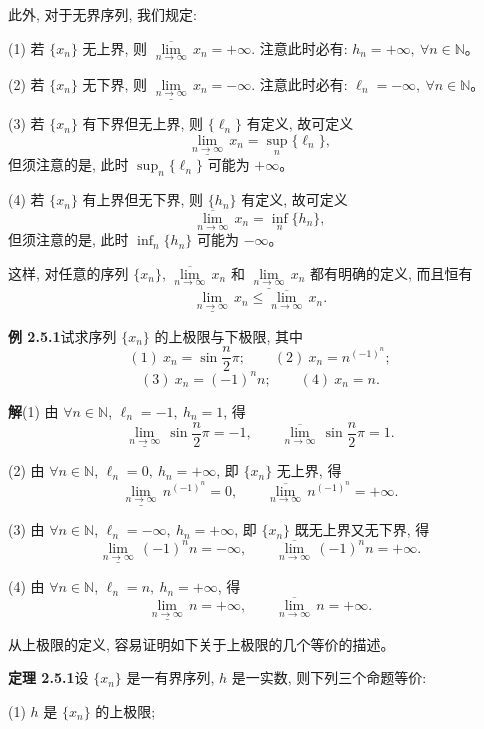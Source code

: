 \documentclass[UTF8, 12pt, fontset=fandol, oneside]{ctexart}
\begin{document}
此外, 对于无界序列, 我们规定:

(1) 若 $\{x_n\}$ 无上界, 则 $\overline{\lim\limits_{n\to\infty}}\,x_n=+\infty$. 注意此时必有: $h_n=+\infty,\ \forall n\in\mathbb{N}$。

(2) 若 $\{x_n\}$ 无下界, 则 $\underline{\lim\limits_{n\to\infty}}\,x_n=-\infty$. 注意此时必有: $\ell_n=-\infty,\ \forall n\in\mathbb{N}$。

(3) 若 $\{x_n\}$ 有下界但无上界, 则 $\{\ell_n\}$ 有定义, 故可定义
\[
  \underline{\lim_{n\to\infty}}\,x_n=\sup_n\{\ell_n\},
\]
但须注意的是, 此时 $\sup_n\{\ell_n\}$ 可能为 $+\infty$。

(4) 若 $\{x_n\}$ 有上界但无下界, 则 $\{h_n\}$ 有定义, 故可定义
\[
  \overline{\lim_{n\to\infty}}\,x_n=\inf_n\{h_n\},
\]
但须注意的是, 此时 $\inf_n\{h_n\}$ 可能为 $-\infty$。

这样, 对任意的序列 $\{x_n\}$, $\overline{\lim\limits_{n\to\infty}}\,x_n$ 和 $\underline{\lim\limits_{n\to\infty}}\,x_n$ 都有明确的定义, 而且恒有
\[
  \underline{\lim_{n\to\infty}}\,x_n
  \leqslant
  \overline{\lim_{n\to\infty}}\,x_n.
\]

\noindent\textbf{例 2.5.1}\quad 试求序列 $\{x_n\}$ 的上极限与下极限, 其中
\[
  (1)\ x_n=\sin\frac n2\pi;\qquad
  (2)\ x_n=n^{(-1)^n};
\]
\[
  (3)\ x_n=(-1)^n n;\qquad
  (4)\ x_n=n.
\]

\noindent\textbf{解}\quad (1) 由 $\forall n\in\mathbb{N}$, $\ell_n=-1,\ h_n=1$, 得
\[
  \underline{\lim_{n\to\infty}}\,\sin\frac n2\pi=-1,
  \qquad
  \overline{\lim_{n\to\infty}}\,\sin\frac n2\pi=1.
\]

(2) 由 $\forall n\in\mathbb{N}$, $\ell_n=0,\ h_n=+\infty$, 即 $\{x_n\}$ 无上界, 得
\[
  \underline{\lim_{n\to\infty}}\, n^{(-1)^n}=0,
  \qquad
  \overline{\lim_{n\to\infty}}\, n^{(-1)^n}=+\infty.
\]

(3) 由 $\forall n\in\mathbb{N}$, $\ell_n=-\infty,\ h_n=+\infty$, 即 $\{x_n\}$ 既无上界又无下界, 得
\[
  \underline{\lim_{n\to\infty}}\,(-1)^n n=-\infty,
  \qquad
  \overline{\lim_{n\to\infty}}\,(-1)^n n=+\infty.
\]

(4) 由 $\forall n\in\mathbb{N}$, $\ell_n=n,\ h_n=+\infty$, 得
\[
  \underline{\lim_{n\to\infty}}\, n=+\infty,
  \qquad
  \overline{\lim_{n\to\infty}}\, n=+\infty.
\]

从上极限的定义, 容易证明如下关于上极限的几个等价的描述。

\noindent\textbf{定理 2.5.1}\quad 设 $\{x_n\}$ 是一有界序列, $h$ 是一实数, 则下列三个命题等价:

(1) $h$ 是 $\{x_n\}$ 的上极限;
\end{document}
